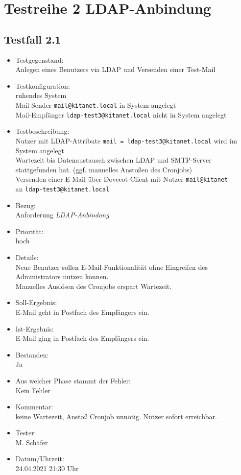 \section{Testreihe 2 LDAP-Anbindung}
\subsection{Testfall 2.1}
\begin{itemize}
	\item Testgegenstand:\\
	Anlegen eines Benutzers via LDAP und Versenden einer Test-Mail
	\item Testkonfiguration:\\
	ruhendes System\\
	Mail-Sender \verb+mail@kitanet.local+ in System angelegt\\
	Mail-Empfänger \verb+ldap-test3@kitanet.local+ nicht in System angelegt
	\item Testbeschreibung:\\
	Nutzer mit LDAP-Attribute \verb+mail = ldap-test3@kitanet.local+ wird im System angelegt\\
	Wartezeit bis Datenaustausch zwischen LDAP und SMTP-Server stattgefunden hat. (ggf. manuelles Anstoßen des Cronjobs)\\
	Versenden einer E-Mail über Dovecot-Client mit Nutzer \verb+mail@kitanet+ \\ an \verb+ldap-test3@kitanet.local+
	\item Bezug:\\
	Anforderung \textit{LDAP-Anbindung}
	\item Priorität:\\
	hoch
	\item Details:\\
	Neue Benutzer sollen E-Mail-Funktionalität ohne Eingreifen des Administrators nutzen können.\\
	Manuelles Auslösen des Cronjobs erspart Wartezeit.
	\item Soll-Ergebnis:\\
	E-Mail geht in Postfach des Empfängers ein.
	\item Ist-Ergebnis:\\
	E-Mail ging in Postfach des Empfängers ein.
	\item Bestanden:\\
	Ja
	\item Aus welcher Phase stammt der Fehler:\\
	Kein Fehler	
	\item Kommentar:\\
	keine Wartezeit, Anstoß Cronjob unnötig. Nutzer sofort erreichbar.
	\item Tester:\\
	M. Schäfer
	\item Datum/Uhrzeit:\\
	24.04.2021 21:30 Uhr
\end{itemize}

